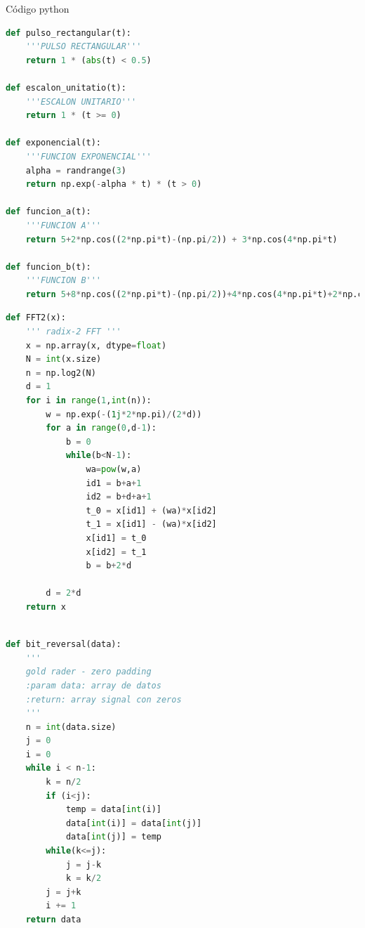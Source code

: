 \documentclass[
	12pt, %
]{fphw}
\begin{document}
\newpage
{\color{teal}
\dotfill
Código python
\dotfill}

\begin{lstlisting}[language=Python, caption=Dibujo de funciones]
def pulso_rectangular(t):
    '''PULSO RECTANGULAR'''
    return 1 * (abs(t) < 0.5)
    
def escalon_unitatio(t):
    '''ESCALON UNITARIO'''
    return 1 * (t >= 0)

def exponencial(t):
    '''FUNCION EXPONENCIAL'''
    alpha = randrange(3)
    return np.exp(-alpha * t) * (t > 0)

def funcion_a(t):
    '''FUNCION A'''
    return 5+2*np.cos((2*np.pi*t)-(np.pi/2)) + 3*np.cos(4*np.pi*t)

def funcion_b(t):
    '''FUNCION B'''
    return 5+8*np.cos((2*np.pi*t)-(np.pi/2))+4*np.cos(4*np.pi*t)+2*np.cos((8*np.pi*t)-(np.pi/2))+np.cos(16*np.pi*t)+2*np.cos((32*np.pi-(np.pi/2)))
\end{lstlisting}

\newpage
\begin{lstlisting}[language=Python, caption=FFT - radix2]
def FFT2(x):
    ''' radix-2 FFT '''
    x = np.array(x, dtype=float)
    N = int(x.size)
    n = np.log2(N)
    d = 1
    for i in range(1,int(n)):
        w = np.exp(-(1j*2*np.pi)/(2*d))
        for a in range(0,d-1):
            b = 0
            while(b<N-1):
                wa=pow(w,a)
                id1 = b+a+1
                id2 = b+d+a+1
                t_0 = x[id1] + (wa)*x[id2]
                t_1 = x[id1] - (wa)*x[id2]
                x[id1] = t_0
                x[id2] = t_1
                b = b+2*d
        
        d = 2*d
    return x
\end{lstlisting}

\begin{lstlisting}[language=Python, caption=Algoritmo Gold Rader]

def bit_reversal(data):
    '''
    gold rader - zero padding
    :param data: array de datos
    :return: array signal con zeros
    '''
    n = int(data.size)
    j = 0
    i = 0
    while i < n-1:
        k = n/2
        if (i<j):
            temp = data[int(i)]
            data[int(i)] = data[int(j)]
            data[int(j)] = temp
        while(k<=j):
            j = j-k
            k = k/2
        j = j+k
        i += 1        
    return data

\end{lstlisting}
\end{document}
